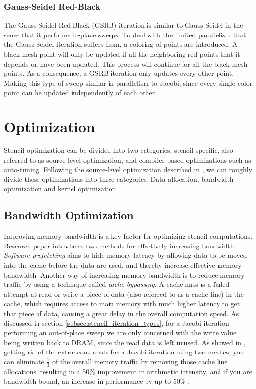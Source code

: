 \subsubsection{Gauss-Seidel Red-Black}
The Gauss-Seidel Red-Black (GSRB) iteration is similar to Gauss-Seidel in the sense that it performs in-place sweeps. To deal with the limited parallelism that the Gauss-Seidel iteration suffers from, a coloring of points are introduced. A black mesh point will only be updated if all the neighboring red points that it depends on have been updated. This process will continue for all the black mesh points. As a consequence, a GSRB iteration only updates every other point. Making this type of sweep similar in parallelism to Jacobi, since every single-color point can be updated independently of each other.

\section{Optimization}
\label{sec:optimization}
Stencil optimization can be divided into two categories, stencil-specific, also referred to as source-level optimization, and compiler based optimizations such as auto-tuning. Following the source-level optimization described in \cite{article9}, we can roughly divide these optimizations into three categories.  Data allocation, bandwidth optimization and kernel optimization. 

\subsection{Bandwidth Optimization}
Improving memory bandwidth is a key factor for optimizing stencil computations. Research paper \cite{article9} introduces two methods for effectively increasing bandwidth. \textit{Software prefetching} aims to hide memory latency by allowing data to be moved into the cache before the data are used, and thereby increase effective memory bandwidth. Another way of increasing memory bandwidth is to reduce memory traffic by using a technique called \textit{cache bypassing}. A cache miss is a failed attempt at read or write a piece of data (also referred to as a cache line) in the cache, which requires access to main memory with much higher latency to get that piece of data, causing a great delay in the overall computation speed. As discussed in section \ref{subsec:stencil_iteration_types}, for a Jacobi iteration performing an out-of-place sweep we are only concerned with the write value being written back to DRAM, since the read data is left unused. As showed in \cite{article9}, getting rid of the extraneous reads for a Jacobi iteration using two meshes, you can eliminate \(\frac{1}{3}\) of the overall memory traffic by removing those cache line allocations, resulting in a 50\% improvement in arithmetic intensity, and if you are bandwidth bound, an increase in performance by up to 50\% \cite{article9}.

